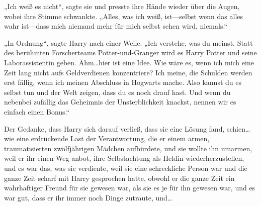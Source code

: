 „Ich weiß es nicht“, sagte sie und presste ihre Hände wieder über die Augen, wobei ihre Stimme schwankte. „Alles, was ich weiß, ist—selbst wenn das alles wahr ist—dass mich niemand mehr für mich selbst sehen wird, niemals.“

„In Ordnung“, sagte Harry nach einer Weile. „Ich verstehe, was du meinst. Statt des berühmten Forscherteams Potter-und-Granger wird es Harry Potter und seine Laborassistentin geben. Ähm…hier ist eine Idee. Wie wäre es, wenn ich mich eine Zeit lang nicht aufs Geldverdienen konzentriere? Ich meine, die Schulden werden erst fällig, wenn ich meinen Abschluss in Hogwarts mache. Also kannst du es selbst tun und der Welt zeigen, dass du es noch drauf hast. Und wenn du nebenbei zufällig das Geheimnis der Unsterblichkeit knackst, nennen wir es einfach einen Bonus.“

Der Gedanke, dass Harry sich darauf verließ, dass sie eine Lösung fand, schien…wie eine erdrückende Last der Verantwortung, die er einem armen, traumatisierten zwölfjährigen Mädchen aufbürdete, und sie wollte ihn umarmen, weil er ihr einen Weg anbot, ihre Selbstachtung als Heldin wiederherzustellen, und es war das, was sie verdiente, weil sie eine schreckliche Person war und die ganze Zeit scharf mit Harry gesprochen hatte, obwohl er die ganze Zeit ein wahrhaftiger Freund für sie gewesen war, als sie es je für ihn gewesen war, und es war gut, dass er ihr immer noch Dinge zutraute, und…

